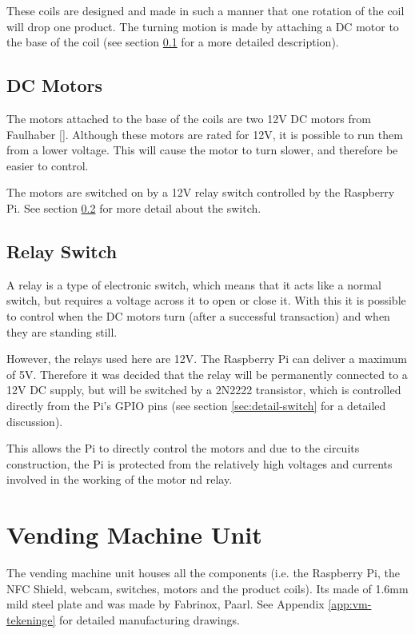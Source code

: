 These coils are designed and made in such a manner that one rotation of the coil will drop one
product. The turning motion is made by attaching a DC motor to the base of the coil (see
section \ref{sec:dc-motor} for a more detailed description).

\subsection{DC Motors}
\label{sec:dc-motor}

The motors attached to the base of the coils are two 12V DC motors from Faulhaber
[\cite{manual:dc-motors}]. Although these motors are rated for 12V, it is possible to run them
from a lower voltage. This will cause the motor to turn slower, and therefore be easier to
control. 

The motors are switched on by a 12V relay switch controlled by the Raspberry Pi. See section
\ref{sec:relay-switch} for more detail about the switch.

\subsection{Relay Switch}
\label{sec:relay-switch}

A relay is a type of electronic switch, which means that it acts like a normal switch, but
requires a voltage across it to open or close it. With this it is possible to control when the
DC motors turn (after a successful transaction) and when they are standing still. 

However, the relays used here are 12V. The Raspberry Pi can deliver a maximum of 5V. Therefore
it was decided that the relay will be permanently connected to a 12V DC supply, but will be
switched by a 2N2222 transistor, which is controlled directly from the Pi's  GPIO pins (see
section \ref{sec:detail-switch} for a detailed discussion).

This allows the Pi to directly control the motors and due to the circuits construction, the Pi
is protected from the relatively high voltages and currents involved in the working of the
motor nd relay.

\section{Vending Machine Unit}

The vending machine unit houses all the components (i.e. the Raspberry Pi, the NFC Shield,
webcam, switches, motors and the product coils). Its made of 1.6mm mild steel plate and was
made by Fabrinox, Paarl. See Appendix \ref{app:vm-tekeninge} for detailed manufacturing
drawings.

